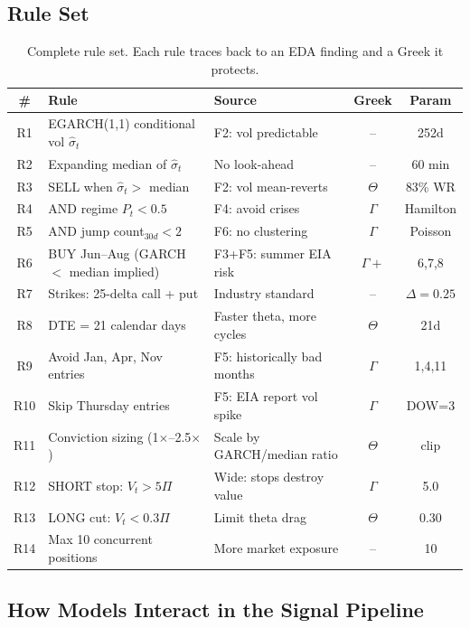 \documentclass[11pt,a4paper]{article}
\begin{document}
\subsection{Rule Set}

\begin{table}[H]
\centering
\caption{Complete rule set. Each rule traces back to an EDA finding and a Greek it protects.}
\label{tab:rules}
\begin{tabularx}{\textwidth}{clXcc}
\toprule
\# & Rule & Source & Greek & Param \\
\midrule
R1 & EGARCH(1,1) conditional vol $\hat{\sigma}_t$ & F2: vol predictable & -- & 252d \\
R2 & Expanding median of $\hat{\sigma}_t$ & No look-ahead & -- & 60 min \\
R3 & SELL when $\hat{\sigma}_t >$ median & F2: vol mean-reverts & $\Theta$ & 83\% WR \\
R4 & AND regime $P_t < 0.5$ & F4: avoid crises & $\Gamma$ & Hamilton \\
R5 & AND jump count$_{30d} < 2$ & F6: no clustering & $\Gamma$ & Poisson \\
R6 & BUY Jun--Aug (GARCH $<$ median implied) & F3+F5: summer EIA risk & $\Gamma+$ & 6,7,8 \\
R7 & Strikes: 25-delta call + put & Industry standard & -- & $\Delta = 0.25$ \\
R8 & DTE = 21 calendar days & Faster theta, more cycles & $\Theta$ & 21d \\
R9 & Avoid Jan, Apr, Nov entries & F5: historically bad months & $\Gamma$ & 1,4,11 \\
R10 & Skip Thursday entries & F5: EIA report vol spike & $\Gamma$ & DOW=3 \\
R11 & Conviction sizing (1$\times$--2.5$\times$) & Scale by GARCH/median ratio & $\Theta$ & clip \\
R12 & SHORT stop: $V_t > 5\Pi$ & Wide: stops destroy value & $\Gamma$ & 5.0 \\
R13 & LONG cut: $V_t < 0.3\Pi$ & Limit theta drag & $\Theta$ & 0.30 \\
R14 & Max 10 concurrent positions & More market exposure & -- & 10 \\
\bottomrule
\end{tabularx}
\end{table}

\subsection{How Models Interact in the Signal Pipeline}
\end{document}
